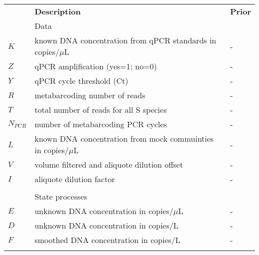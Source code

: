 \documentclass{article}
\begin{document}
\begin{table}[h]
    \centering
    \begin{tabular}{lll}
         & \textbf{Description} & \textbf{Prior} \\
&Data & \\
\hline
$K$ & known DNA concentration from qPCR standards in copies/$\mu$L & - \\
$Z$ & qPCR amplification (yes=1; no=0) & - \\
$Y$ & qPCR cycle threshold (Ct) & - \\
$R$ & metabarcoding number of reads & - \\
$T$ & total number of reads for all S species & - \\
$N_{PCR}$ & number of metabarcoding PCR cycles & - \\
$L$ & known DNA concentration from mock commuinties in copies/$\mu$L & - \\
$V$ & volume filtered and aliquote dilution offset & -\\
$I$ & aliquote dilution factor & -\\

&&\\
&State processes&\\
\hline
$E$ & unknown DNA concentration in copies/$\mu$L & - \\
$D$ & unknown DNA concentration in copies/L & - \\
$F$ & smoothed DNA concentration in copies/L & - \\
&&\\


\end{tabular}
\end{table}
\end{document}
